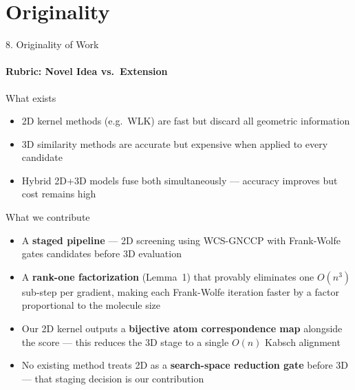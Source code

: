 \documentclass[aspectratio=169, 11pt]{beamer}
\begin{document}

\section{Originality}
\begin{frame}{8. Originality of Work}
\framesubtitle{Rubric: Novel Idea vs.\ Extension}

\begin{block}{What exists}
\begin{itemize}
    \item 2D kernel methods (e.g.\ WLK) are fast but discard all geometric information
    \item 3D similarity methods are accurate but expensive when applied to every candidate
    \item Hybrid 2D+3D models fuse both simultaneously --- accuracy improves but cost remains high
\end{itemize}
\end{block}

\vspace{0.3em}

\begin{block}{What we contribute}
\begin{itemize}
    \item A \textbf{staged pipeline} --- 2D screening using WCS-GNCCP with Frank-Wolfe gates candidates before 3D evaluation
    \item A \textbf{rank-one factorization} (Lemma~1) that provably eliminates one $O(n^3)$ sub-step per gradient, making each Frank-Wolfe iteration faster by a factor proportional to the molecule size
    \item Our 2D kernel outputs a \textbf{bijective atom correspondence map} alongside the score --- this reduces the 3D stage to a single $O(n)$ Kabsch alignment
    \item No existing method treats 2D as a \textbf{search-space reduction gate} before 3D --- that staging decision is our contribution
\end{itemize}
\end{block}

\end{frame}

\end{document}
